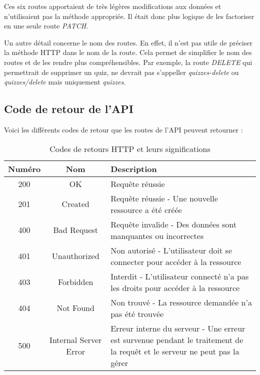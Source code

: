 Ces six routes apportaient de très légères modifications aux données et n'utilisaient pas la méthode appropriée. Il était donc plus logique de les factoriser en une seule route \emph{PATCH}.

Un autre détail concerne le nom des routes. En effet, il n'est pas utile de préciser la méthode HTTP dans le nom de la route. Cela permet de simplifier le nom des routes et de les rendre plus compréhensibles. Par exemple, la route \emph{DELETE} qui permettrait de supprimer un quiz, ne devrait pas s'appeller \emph{quizzes-delete} ou \emph{quizzes/delete} mais uniquement \emph{quizzes}.

\subsection{Code de retour de l'API}
Voici les différents codes de retour que les routes de l'API peuvent retourner :

\begin{table}[H]
    \centering
    \caption{Codes de retours HTTP et leurs significations}
    \begin{tabular}{|c|c|p{8cm}|} %
        \hline
        \textbf{Numéro} & \textbf{Nom}          & \textbf{Description}                                                                                                      \\
        \hline
        200             & OK                    & Requête réussie                                                                                                           \\
        \hline
        201             & Created               & Requête réussie - Une nouvelle ressource a été créée                                                                      \\
        \hline
        400             & Bad Request           & Requête invalide - Des données sont manquantes ou incorrectes                                                             \\
        \hline
        401             & Unauthorized          & Non autorisé - L'utilisateur doit se connecter pour accéder à la ressource                                                \\
        \hline
        403             & Forbidden             & Interdit - L'utilisateur connecté n'a pas les droits pour accéder à la ressource                                          \\
        \hline
        404             & Not Found             & Non trouvé - La ressource demandée n'a pas été trouvée                                                                    \\
        \hline
        500             & Internal Server Error & Erreur interne du serveur - Une erreur est survenue pendant le traitement de la requêt et le serveur ne peut pas la gérer \\
        \hline
    \end{tabular}
\end{table}

